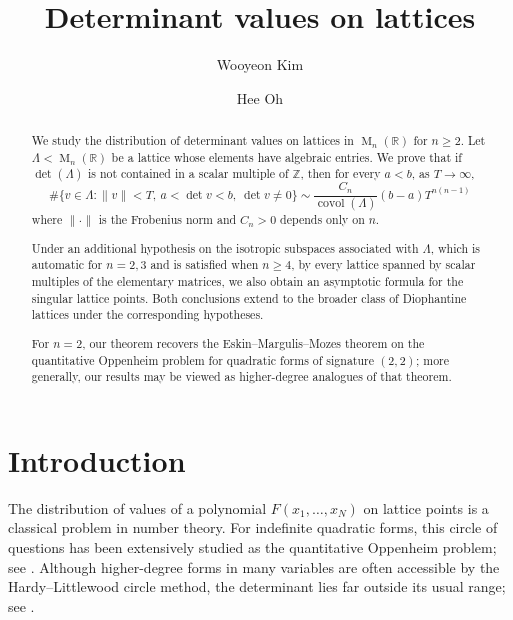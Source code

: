 \documentclass[reqno,11pt]{amsart}
\numberwithin{equation}{section}
\theoremstyle{definition}
\theoremstyle{remark}
\newcommand{\op}{\operatorname}
\newcommand{\M}{\op{M}}
\newcommand{\covol}{\op{covol}}
\begin{document}
\title[Determinant values on lattices]{Determinant values on lattices}
\begin{abstract}
We study the distribution of determinant values on lattices in $\M_n(\mathbb R)$ for $n\ge 2$. Let $\Lambda<\M_n(\mathbb R)$ be a lattice whose elements have algebraic entries. We prove that if $\det(\Lambda)$ is not contained in a scalar multiple of $\mathbb Z$, then for every $a<b$, as $T\to\infty$,
$$ \#\{v\in\Lambda:\|v\|<T,\ a<\det v<b,\ \det v\ne0\}
\sim
\frac{C_n}{\covol(\Lambda)}
(b-a)T^{n(n-1)}
$$
 where $\|\cdot\|$ is the Frobenius norm and $C_n>0$ depends only on $n$.


Under an additional hypothesis on the isotropic subspaces associated with $\Lambda$, which is automatic for $n=2,3$ and is satisfied when  $n\ge4$, by every lattice spanned by scalar multiples of the elementary matrices, we also obtain an asymptotic formula for the singular lattice points. Both conclusions extend to the broader class of Diophantine lattices under the corresponding hypotheses.

For $n=2$, our theorem recovers the Eskin--Margulis--Mozes theorem on the quantitative Oppenheim problem for quadratic forms of signature $(2,2)$; more generally, our results may be viewed as higher-degree analogues of that theorem.
\end{abstract}




\author{Wooyeon Kim}
\address{Korea Institute for
Advanced Study, Seoul, Republic of Korea}


\author{Hee Oh}
\address{Department of Mathematics, Yale University, New Haven, CT}

\maketitle


\section{Introduction}
The distribution of values of a polynomial $F(x_1,\ldots,x_N)$ on lattice
points is a classical problem in number theory. For indefinite quadratic
forms, this circle of questions has been extensively studied as the quantitative Oppenheim problem; see
\cite{Margulis:1987,Margulis:1989,dani-margulis:1993,eskin-margulis-mozes:1998,eskin-margulis-mozes:2005,Kim}.  Although higher-degree forms in many variables are often accessible by the
Hardy--Littlewood circle method, the determinant lies far outside its usual
range; see .
\end{document}
